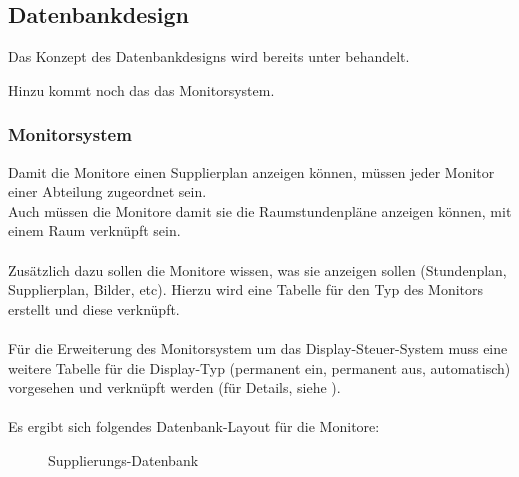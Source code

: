 \subsection{Datenbankdesign}

Das Konzept des Datenbankdesigns wird bereits unter  behandelt.

Hinzu kommt noch das das Monitorsystem.

\subsubsection{Monitorsystem}

Damit die Monitore einen Supplierplan anzeigen können, müssen jeder Monitor einer Abteilung zugeordnet sein.\\
Auch müssen die Monitore damit sie die Raumstundenpläne anzeigen können, mit einem Raum verknüpft sein.\\
\\
Zusätzlich dazu sollen die Monitore wissen, was sie anzeigen sollen (Stundenplan, Supplierplan, Bilder, etc). Hierzu wird eine Tabelle für den Typ des Monitors erstellt und diese verknüpft.\\
\\ 
Für die Erweiterung des Monitorsystem um das Display-Steuer-System muss eine weitere Tabelle für die Display-Typ (permanent ein, permanent aus, automatisch) vorgesehen und verknüpft werden (für Details, siehe ).\\
\\
Es ergibt sich folgendes Datenbank-Layout für die Monitore:
\begin{figure}[H]
\centering
{}
\caption{Supplierungs-Datenbank}
\end{figure}
